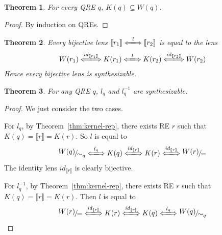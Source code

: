 \documentclass[a4paper,11pt] {article}
\theoremstyle{plain}
\newtheorem{theorem}{Theorem}[section]
\newcommand{\lensbetween}[1]{\xLongleftrightarrow{#1}}
\newcommand{\niceFrac}[2]{%
    \raise.5ex\hbox{$#1$}%
    \kern-.1em/\kern-.15em%
    \lower.25ex\hbox{$#2$}}
\begin{document}
\begin{theorem}
  \label{thm:kq-subset-wq}
  For every QRE $q$, $K(q) \subseteq W(q)$. 
\end{theorem}
\begin{proof}
  By induction on QREs.
\end{proof}

\begin{theorem}
  \label{thm:bijective-syn}
  Every bijective lens
  $\llbracket r_1 \rrbracket \lensbetween{l} \llbracket r_2
  \rrbracket$
  is equal to the lens
  \begin{align*}
    W(r_1) \lensbetween{\mathit{id}_{\llbracket r_1 \rrbracket}} K(r_1)
    \lensbetween{l}
    K(r_2) \lensbetween{\mathit{id}_{\llbracket r_2 \rrbracket}} W(r_2)
  \end{align*}
  Hence every bijective lens is synthesizable.
\end{theorem}



\begin{theorem}
  \label{thm:basic-qre-syn}
  For any QRE $q$, $l_q$ and $l_q^{-1}$ are synthesizable.
\end{theorem}
\begin{proof}
  We just consider the two cases.

  For $l_q$, by Theorem~\ref{thm:kernel-rep},
  there exists RE $r$ such that
  $K(q) = \llbracket r \rrbracket = K(r)$.
  So $l$ is equal to 
  \begin{align*}
    \niceFrac{W(q)}{\sim_{q}} \lensbetween{l_q}
    K(q) \lensbetween{\mathit{id}_{\llbracket r \rrbracket}} K(r)
    \lensbetween{\mathit{id}_{\llbracket r \rrbracket}}
    \niceFrac{W(r)}{=}
  \end{align*}
  The identity lens $\mathit{id}_{\llbracket r \rrbracket}$ is
  clearly bijective.
  
  For $l_q^{-1}$, by Theorem~\ref{thm:kernel-rep},
  there exists RE $r$ such that
  $K(q) = \llbracket r \rrbracket = K(r)$.
  Then $l$ is equal to 
  \begin{align*}
    \niceFrac{W(r)}{=}
    \lensbetween{\mathit{id}_{\llbracket r \rrbracket}} K(r)
    \lensbetween{\mathit{id}_{\llbracket r \rrbracket}}
    K(q) \lensbetween{l_q} \niceFrac{W(q)}{\sim_q}
  \end{align*}
\end{proof}
\end{document}
